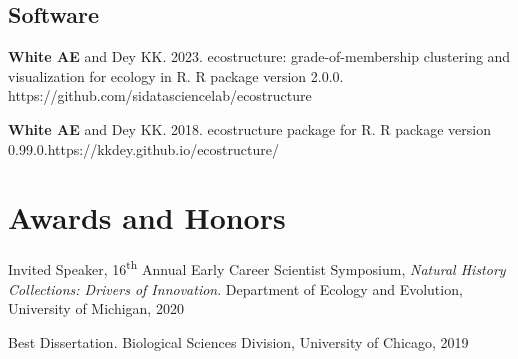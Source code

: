 \documentclass[letterpaper]{article}
\newenvironment{biblist}{%
   \begin{list}{}{%
     \setlength{\labelwidth}{0pt}%
     \setlength{\labelsep}{1em}%
     \setlength{\leftmargin}{2em}%
     \setlength{\itemindent}{-1em}%
   }
}{\end{list}}
\begin{document}
\subsection*{Software}
\begin{biblist}
\item \textbf{White AE} and Dey KK. 2023. ecostructure: grade-of-membership clustering and visualization for ecology in R. R package version 2.0.0. https://github.com/sidatasciencelab/ecostructure

\item \textbf{White AE} and Dey KK. 2018. ecostructure package for R. R package version 0.99.0.\newline https://kkdey.github.io/ecostructure/

\end{biblist}

\section*{Awards and Honors}
\begin{biblist}
\item Invited Speaker, 16\textsuperscript{th} Annual Early Career Scientist Symposium, \textit{Natural History Collections: Drivers of Innovation}. Department of Ecology and Evolution, University of Michigan, 2020

\item Best Dissertation. Biological Sciences Division, University of Chicago, 2019
\end{biblist}
\end{document}
